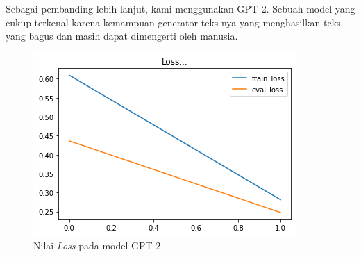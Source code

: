 Sebagai pembanding lebih lanjut, kami menggunakan GPT-2. Sebuah model yang cukup terkenal karena kemampuan generator teks-nya yang menghasilkan teks yang bagus dan masih dapat dimengerti oleh manusia.

\begin{figure}[h]
    \begin{center}
        \includegraphics[width= 0.9\linewidth]{gambar/loss_gpt.png}
        \caption{Nilai \textit{Loss} pada model GPT-2}
        \label{fig: loss_gpt}
    \end{center}
\end{figure}

